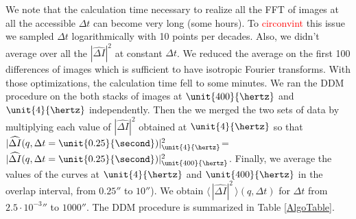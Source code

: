 \documentclass[%
 aip,
 jmp,%
 amsmath,amssymb,
reprint,%
]{revtex4-1}
\begin{document}
We note that the calculation time necessary to realize all the FFT of images at all the accessible $\Delta t$ can become very long (some hours). To \textcolor{red}{circonvint} this issue we sampled $\Delta t$ logarithmically with 10 points per decades.  Also, we didn't average over all the $|\widehat{\Delta I}|^2$ at constant $\Delta t$. We reduced the average on the first 100 differences of images which is sufficient to have isotropic Fourier transforms. With those optimizations, the calculation time fell to some minutes. We ran the DDM procedure on the both stacks of images at $\unit{400}{\hertz}$ and $\unit{4}{\hertz}$ independently. Then the we merged the two sets of data by multiplying each value of $|\widehat{\Delta I}|^2$ obtained at $\unit{4}{\hertz}$ so that $|\widehat{\Delta I}(q,\Delta t = \unit{0.25}{\second})|^2_{\unit{4}{\hertz}}$=$|\widehat{\Delta I}(q,\Delta t = \unit{0.25}{\second})|^2_{\unit{400}{\hertz}}$. Finally, we average the values of the curves at $\unit{4}{\hertz}$ and $\unit{400}{\hertz}$ in the overlap interval, from $\unit{0.25}{\second}$ to $\unit{10}{\second}$). We obtain $\langle \, |\widehat{\Delta I}|^2 \, \rangle (q, \Delta t)$ for $\Delta t$ from $\unit{2.5\cdot 10^{-3}}{\second}$ to $\unit{1000}{\second}$. The DDM procedure is summarized in Table \ref{AlgoTable}.
\end{document}
